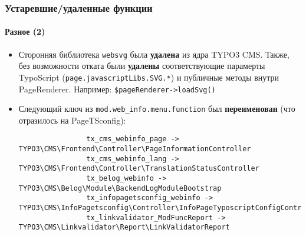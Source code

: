
\begin{frame}[fragile]
	\frametitle{Устаревшие/удаленные функции}
	\framesubtitle{Разное (2)}

	\lstset{basicstyle=\tiny\ttfamily}

	\begin{itemize}

		\item Сторонняя библиотека \texttt{websvg} была \textbf{удалена}
			из ядра TYPO3 CMS. Также, без возможности отката были \textbf{удалены}
			соответствующие парамерты TypoScript
			(\texttt{page.javascriptLibs.SVG.*}) и публичные методы внутри PageRenderer.\newline
			Например: \texttt{\$pageRenderer->loadSvg()}

		\item Следующий ключ из \texttt{mod.web\_info.menu.function}
			был \textbf{переименован} (что отразилось на PageTSconfig):

			\begin{lstlisting}
				tx_cms_webinfo_page -> TYPO3\CMS\Frontend\Controller\PageInformationController
				tx_cms_webinfo_lang -> TYPO3\CMS\Frontend\Controller\TranslationStatusController
				tx_belog_webinfo -> TYPO3\CMS\Belog\Module\BackendLogModuleBootstrap
				tx_infopagetsconfig_webinfo -> TYPO3\CMS\InfoPagetsconfig\Controller\InfoPageTyposcriptConfigController
				tx_linkvalidator_ModFuncReport -> TYPO3\CMS\Linkvalidator\Report\LinkValidatorReport
			\end{lstlisting}

	\end{itemize}

\end{frame}



